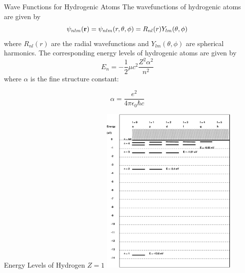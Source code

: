 \documentclass[aspectratio=1610,xcolor=dvipsnames,t]{beamer}
\begin{document}
    \begin{frame}{Wave Functions for Hydrogenic Atoms} 
    The wavefunctions of hydrogenic atoms are given by
    \begin{equation}
        \psi_{nlm}({\bf r}) = \psi_{nlm}(r,\theta,\phi)
                           = R_{nl}(r) Y_{lm}(\theta, \phi)
    \end{equation}
    where $R_{nl}(r)$ are the radial wavefunctions and $Y_{lm}(\theta, \phi)$ are
    spherical harmonics. The corresponding energy levels of hydrogenic atoms are
    given by
    \begin{equation}
        E_n = - \frac{1}{2} \mu c^2 \frac{Z^2 \alpha^2}{n^2}
    \end{equation}
    where $\alpha$ is the fine structure constant: 

    $$ \alpha = \frac{e^2}{4 \pi \epsilon_0 \hbar c} $$

    \end{frame} 

    

    \begin{frame}{Energy Levels of Hydrogen $Z=1$} 
        \centering
        \includegraphics[width=0.5\textwidth]{levels.eps}
    \end{frame} 
\end{document}
